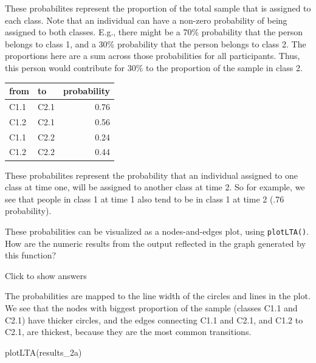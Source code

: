 \documentclass[
]{book}
\newenvironment{Shaded}{\begin{snugshade}}{\end{snugshade}}
\newcommand{\FunctionTok}[1]{\textcolor[rgb]{0.00,0.00,0.00}{#1}}
\newcommand{\NormalTok}[1]{#1}
\newcommand{\SpecialCharTok}[1]{\textcolor[rgb]{0.00,0.00,0.00}{#1}}
\begin{document}
These probabilites represent the proportion of the total sample that is assigned to each class. Note that an individual can have a non-zero probability of being assigned to both classes. E.g., there might be a 70\% probability that the person belongs to class 1, and a 30\% probability that the person belongs to class 2. The proportions here are a sum across those probabilities for all participants. Thus, this person would contribute for 30\% to the proportion of the sample in class 2.

\begin{Shaded}
\end{Shaded}

\begin{tabular}[t]{l|l|r}
\hline
from & to & probability\\
\hline
C1.1 & C2.1 & 0.76\\
\hline
C1.2 & C2.1 & 0.56\\
\hline
C1.1 & C2.2 & 0.24\\
\hline
C1.2 & C2.2 & 0.44\\
\hline
\end{tabular}

These probabilites represent the probability that an individual assigned to one class at time one, will be assigned to another class at time 2. So for example, we see that people in class 1 at time 1 also tend to be in class 1 at time 2 (.76 probability).

These probabilities can be visualized as a nodes-and-edges plot, using \texttt{plotLTA()}. How are the numeric results from the output reflected in the graph generated by this function?

Click to show answers

The probabilities are mapped to the line width of the circles and lines in the plot. We see that the nodes with biggest proportion of the sample (classes C1.1 and C2.1) have thicker circles, and the edges connecting C1.1 and C2.1, and C1.2 to C2.1, are thickest, because they are the most common transitions.

\begin{Shaded}
\begin{Highlighting}[]
\FunctionTok{plotLTA}\NormalTok{(results\_2a)}
\end{Highlighting}
\end{Shaded}
\end{document}

